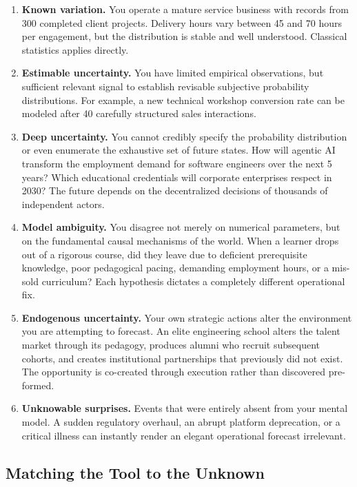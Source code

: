 \begin{enumerate}[leftmargin=12pt,itemsep=3pt,topsep=2pt,parsep=0pt]
  \item \textbf{Known variation.} You operate a mature service business with records from 300 completed client projects. Delivery hours vary between 45 and 70 hours per engagement, but the distribution is stable and well understood. Classical statistics applies directly.
  \item \textbf{Estimable uncertainty.} You have limited empirical observations, but sufficient relevant signal to establish revisable subjective probability distributions. For example, a new technical workshop conversion rate can be modeled after 40 carefully structured sales interactions.
  \item \textbf{Deep uncertainty.} You cannot credibly specify the probability distribution or even enumerate the exhaustive set of future states. How will agentic AI transform the employment demand for software engineers over the next 5 years? Which educational credentials will corporate enterprises respect in 2030? The future depends on the decentralized decisions of thousands of independent actors.
  \item \textbf{Model ambiguity.} You disagree not merely on numerical parameters, but on the fundamental causal mechanisms of the world. When a learner drops out of a rigorous course, did they leave due to deficient prerequisite knowledge, poor pedagogical pacing, demanding employment hours, or a mis-sold curriculum? Each hypothesis dictates a completely different operational fix.
  \item \textbf{Endogenous uncertainty.} Your own strategic actions alter the environment you are attempting to forecast. An elite engineering school alters the talent market through its pedagogy, produces alumni who recruit subsequent cohorts, and creates institutional partnerships that previously did not exist. The opportunity is co-created through execution rather than discovered pre-formed.
  \item \textbf{Unknowable surprises.} Events that were entirely absent from your mental model. A sudden regulatory overhaul, an abrupt platform deprecation, or a critical illness can instantly render an elegant operational forecast irrelevant.
\end{enumerate}

\subsection{Matching the Tool to the Unknown}

